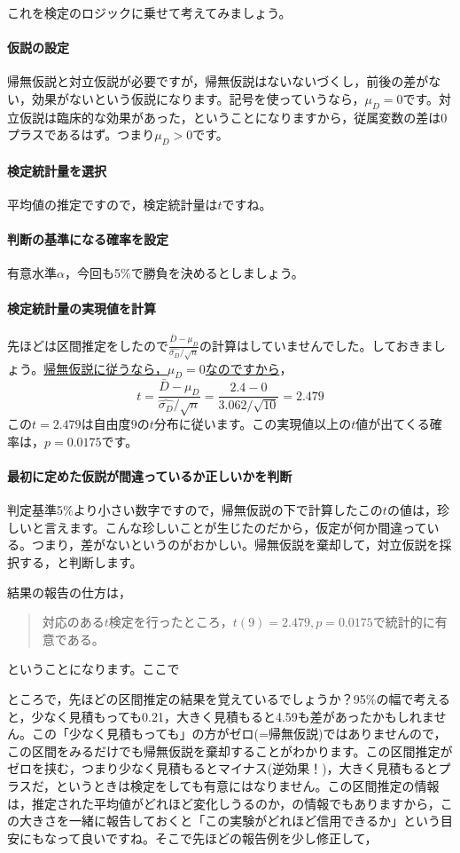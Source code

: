 \documentclass{ltjsarticle}
\begin{document}
これを検定のロジックに乗せて考えてみましょう。
\paragraph{仮説の設定}帰無仮説と対立仮説が必要ですが，帰無仮説はないないづくし，前後の差がない，効果がないという仮説になります。記号を使っていうなら，$\mu_D=0$です。対立仮説は臨床的な効果があった，ということになりますから，従属変数の差は0プラスであるはず。つまり$\mu_D > 0$です。
\paragraph{検定統計量を選択}平均値の推定ですので，検定統計量は$t$ですね。
\paragraph{判断の基準になる確率を設定}有意水準$\alpha$，今回も5\%で勝負を決めるとしましょう。
\paragraph{検定統計量の実現値を計算}先ほどは区間推定をしたので$\frac{\bar{D}-\mu_D}{\hat{\sigma_D}/\sqrt{n}} $の計算はしていませんでした。しておきましょう。\underline{帰無仮説に従うなら，$\mu_D=0$なのですから}，
\[t= \frac{\bar{D}-\mu_D}{\hat{\sigma_D}/\sqrt{n}}  = \frac{2.4-0}{3.062/\sqrt{10}}  = 2.479\]
この$t = 2.479$は自由度$9$の$t$分布に従います。この実現値以上の$t$値が出てくる確率は，$p=0.0175$です。
\paragraph{最初に定めた仮説が間違っているか正しいかを判断}
判定基準5\%より小さい数字ですので，帰無仮説の下で計算したこの$t$の値は，珍しいと言えます。こんな珍しいことが生じたのだから，仮定が何か間違っている。つまり，差がないというのがおかしい。帰無仮説を棄却して，対立仮説を採択する，と判断します。

結果の報告の仕方は，
\begin{quote}
    対応のある$t$検定を行ったところ，$t(9)=2.479,p=0.0175$で統計的に有意である。
\end{quote}
ということになります。ここで

ところで，先ほどの区間推定の結果を覚えているでしょうか？95\%の幅で考えると，少なく見積もっても0.21，大きく見積もると4.59も差があったかもしれません。この「少なく見積もっても」の方がゼロ(=帰無仮説)ではありませんので，この区間をみるだけでも帰無仮説を棄却することがわかります。この区間推定がゼロを挟む，つまり少なく見積もるとマイナス(逆効果！)，大きく見積もるとプラスだ，というときは検定をしても有意にはなりません。この区間推定の情報は，推定された平均値がどれほど変化しうるのか，の情報でもありますから，この大きさを一緒に報告しておくと「この実験がどれほど信用できるか」という目安にもなって良いですね。そこで先ほどの報告例を少し修正して，
\end{document}
